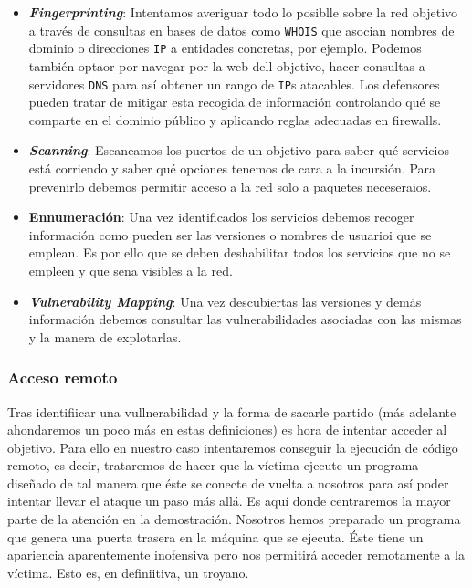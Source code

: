 \documentclass[12pt]{article}
\begin{document}
                \begin{itemize}
                    \item \textbf{\textit{Fingerprinting}}: Intentamos averiguar todo lo posiblle sobre la red objetivo a través de consultas en bases de datos como \texttt{WHOIS} que asocian nombres de dominio o direcciones \texttt{IP} a entidades concretas, por ejemplo. Podemos también optaor por navegar por la web dell objetivo, hacer consultas a servidores \texttt{DNS} para así obtener un rango de \texttt{IP}s atacables. Los defensores pueden tratar de mitigar esta recogida de información controlando qué se comparte en el dominio público y aplicando reglas adecuadas en firewalls.
                    \item \textbf{\textit{Scanning}}: Escaneamos los puertos de un objetivo para saber qué servicios está corriendo y saber qué opciones tenemos de cara a la incursión. Para prevenirlo debemos permitir acceso a la red solo a paquetes neceseraios.
                   \item \textbf{Ennumeración}: Una vez identificados los servicios debemos recoger información como pueden ser las versiones o nombres de usuarioi que se emplean. Es por ello que se deben deshabilitar todos los servicios que no se empleen y que sena visibles a la red.
                   \item \textbf{\textit{Vulnerability Mapping}}: Una vez descubiertas las versiones y demás información debemos consultar las vulnerabilidades asociadas con las mismas y la manera de explotarlas.
                \end{itemize}

            \subsubsection{Acceso remoto}
                Tras identifiicar una vullnerabilidad y la forma de sacarle partido (más adelante ahondaremos un poco más en estas definiciones) es hora de intentar acceder al objetivo. Para ello en nuestro caso intentaremos conseguir la ejecución de código remoto, es decir, trataremos de hacer que la víctima ejecute un programa diseñado de tal manera que éste se conecte de vuelta a nosotros para así poder intentar llevar el ataque un paso más allá. Es aquí donde centraremos la mayor parte de la atención en la demostración. Nosotros hemos preparado un programa que genera una puerta trasera en la máquina que se ejecuta. Éste tiene un apariencia aparentemente inofensiva pero nos permitirá acceder remotamente a la víctima. Esto es, en definiitiva, un troyano.
\end{document}
